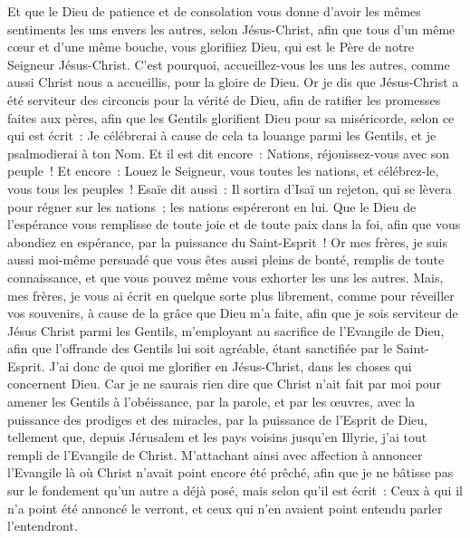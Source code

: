 \begin{multicols}{2}
Et que le Dieu de patience et de consolation vous donne d'avoir les mêmes sentiments les uns envers les autres, selon Jésus-Christ,
afin que tous d'un même cœur et d'une même bouche, vous glorifiiez Dieu, qui est le Père de notre Seigneur Jésus-Christ.
C'est pourquoi, accueillez-vous les uns les autres, comme aussi Christ nous a accueillis, pour la gloire de Dieu.
Or je dis que Jésus-Christ a été serviteur des circoncis pour la vérité de Dieu, afin de ratifier les promesses faites aux pères,
afin que les Gentils glorifient Dieu pour sa miséricorde, selon ce qui est écrit~: Je célébrerai à cause de cela ta louange parmi les Gentils, et je psalmodierai à ton Nom. Et il est dit encore~:
Nations, réjouissez-vous avec son peuple~!
Et encore~: Louez le Seigneur, vous toutes les nations, et célébrez-le, vous tous les peuples~! Esaïe dit aussi~:
Il sortira d'Isaï un rejeton, qui se lèvera pour régner sur les nations~; les nations espéreront en lui.
Que le Dieu de l'espérance vous remplisse de toute joie et de toute paix dans la foi, afin que vous abondiez en espérance, par la puissance du Saint-Esprit~!
 Or mes frères, je suis aussi moi-même persuadé que vous êtes aussi pleins de bonté, remplis de toute connaissance, et que vous pouvez même vous exhorter les uns les autres.
Mais, mes frères, je vous ai écrit en quelque sorte plus librement, comme pour réveiller vos souvenirs, à cause de la grâce que Dieu m'a faite,
afin que je sois serviteur de Jésus Christ parmi les Gentils, m'employant au sacrifice de l'Evangile de Dieu, afin que l'offrande des Gentils lui soit agréable, étant sanctifiée par le Saint-Esprit.
J'ai donc de quoi me glorifier en Jésus-Christ, dans les choses qui concernent Dieu.
Car je ne saurais rien dire que Christ n'ait fait par moi pour amener les Gentils à l'obéissance, par la parole, et par les œuvres,
avec la puissance des prodiges et des miracles, par la puissance de l'Esprit de Dieu, tellement que, depuis Jérusalem et les pays voisins jusqu'en Illyrie, j'ai tout rempli de l'Evangile de Christ.
M'attachant ainsi avec affection à annoncer l'Evangile là où Christ n'avait point encore été prêché, afin que je ne bâtisse pas sur le fondement qu'un autre a déjà posé, 
mais selon qu'il est écrit~: Ceux à qui il n'a point été annoncé le verront, et ceux qui n'en avaient point entendu parler l'entendront.

\end{multicols}
